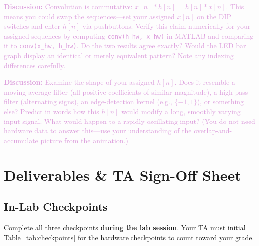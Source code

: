 \documentclass[11pt,letterpaper]{article}
\providecommand{\disECE}[1]{\textcolor{Plum}{\textbf{Discussion:} #1}}
\begin{document}
\disECE{Convolution is commutative: $x[n] * h[n] = h[n] * x[n]$. This means you could swap the sequences---set your assigned $x[n]$ on the DIP switches and enter $h[n]$ via pushbuttons. Verify this claim numerically for your assigned sequences by computing \texttt{conv(h\_hw, x\_hw)} in MATLAB and comparing it to \texttt{conv(x\_hw, h\_hw)}. Do the two results agree exactly? Would the LED bar graph display an identical or merely equivalent pattern? Note any indexing differences carefully.}

\disECE{Examine the shape of your assigned $h[n]$. Does it resemble a moving-average filter (all positive coefficients of similar magnitude), a high-pass filter (alternating signs), an edge-detection kernel (e.g., $\{-1, 1\}$), or something else? Predict in words how this $h[n]$ would modify a long, smoothly varying input signal. What would happen to a rapidly oscillating input? (You do not need hardware data to answer this---use your understanding of the overlap-and-accumulate picture from the animation.)}

\clearpage

\clearpage

\section{Deliverables \& TA Sign-Off Sheet}

\subsection{In-Lab Checkpoints}

Complete all three checkpoints \textbf{during the lab session}. Your TA must initial Table~\ref{tab:checkpoints} for the hardware checkpoints to count toward your grade.
\end{document}
